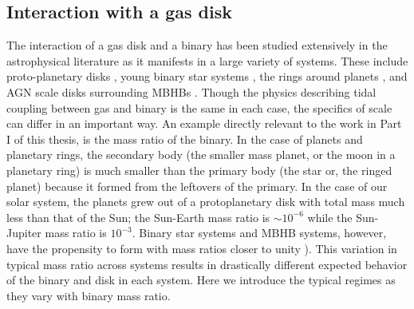 \subsection{Interaction with a gas disk}

The interaction of a gas disk and a binary has been studied extensively in the
astrophysical literature as it manifests in a large variety of systems. These
include proto-planetary disks \citep[\emph{e.g.}][]{Ward:1997}, young binary
star systems \citep[\emph{e.g.}][]{AL94}, the rings around planets
\citep{GTSaturn78}, and AGN scale disks surrounding MBHBs
\citep[\emph{e.g.}][]{GouldRix:2000}. Though the physics describing tidal
coupling between gas and binary is the same in each case, the specifics of
scale can differ in an important way.  An example directly relevant to the
work in Part I of this thesis, is the mass ratio of the binary. In the case of
planets and planetary rings, the secondary body (the smaller mass planet, or
the moon in a planetary ring) is much smaller than the primary body (the star
or, the ringed planet) because it formed from the leftovers of the primary. In
the case of our solar system, the planets grew out of a protoplanetary disk
with total mass much less than that of the Sun; the Sun-Earth mass
ratio is $\sim10^{-6}$ while the Sun-Jupiter mass ratio is $10^{-3}$. Binary
star systems and MBHB systems, however, have the propensity to form with mass
ratios closer to unity \citep[for MBHBs see previous section, for stars see][]{StellMassRatDist:2015}). This variation in typical mass ratio across
systems results in drastically different expected behavior of the binary and
disk in each system. Here we introduce the typical regimes as they vary with
binary mass ratio.

